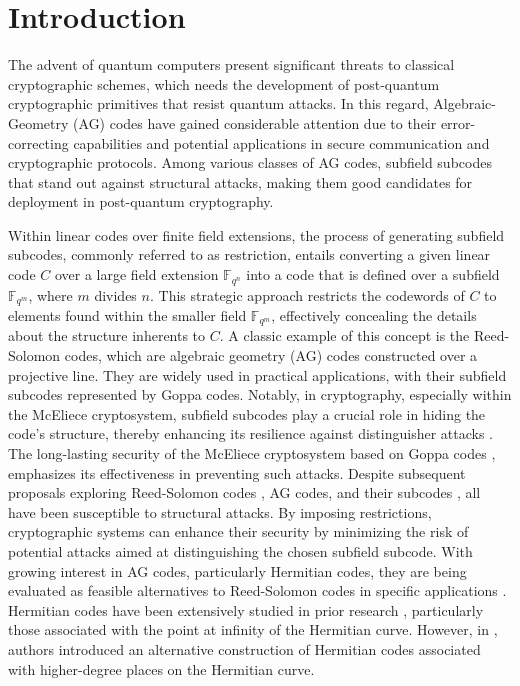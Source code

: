 \documentclass[entropy,article,submit,pdftex,moreauthors]{Definitions/mdpi}
\begin{document}
\section{Introduction}

The advent of quantum computers present significant threats to classical cryptographic schemes, which needs the development of post-quantum cryptographic primitives that resist quantum attacks. In this regard, Algebraic-Geometry (AG) codes have gained considerable attention due to their error-correcting capabilities and potential applications in secure communication and cryptographic protocols. Among various classes of AG codes, subfield subcodes that stand out against structural attacks, making them good candidates for deployment in post-quantum cryptography.



Within linear codes over finite field extensions, the process of generating subfield subcodes, commonly referred to as restriction, entails converting a given linear code $C$ over a large field extension $\mathbb{F}_{q^n}$ into a code that is defined over a subfield $\mathbb{F}_{q^m}$, where $m$ divides $n$. This strategic approach restricts the codewords of $C$ to elements found within the smaller field $\mathbb{F}_{q^m}$, effectively concealing the details about the structure inherents to $C$. A classic example of this concept is the Reed-Solomon codes, which are algebraic geometry (AG) codes constructed over a projective line. They are widely used in practical applications, with their subfield subcodes represented by Goppa codes. Notably, in cryptography, especially within the McEliece cryptosystem, subfield subcodes play a crucial role in hiding the code's structure, thereby enhancing its resilience against distinguisher attacks \cite{sendrier2002security, faugere2013distinguisher}. The long-lasting security of the McEliece cryptosystem based on Goppa codes \cite{mceliece1978public}, emphasizes its effectiveness in preventing such attacks. Despite subsequent proposals exploring Reed-Solomon codes \cite{couvreur2014distinguisher}, AG codes, and their subcodes \cite{couvreur2017cryptanalysis}, all have been susceptible to structural attacks. By imposing restrictions, cryptographic systems can enhance their security by minimizing the risk of potential attacks aimed at distinguishing the chosen subfield subcode. With growing interest in AG codes, particularly Hermitian codes, they are being evaluated as feasible alternatives to Reed-Solomon codes in specific applications \cite{macdonald2003hermitian}. Hermitian codes have been extensively studied in prior research \cite{stichtenoth1988note, little1997structure, yang1992true, korchmaros2019codes, ren2004structure, lhotel2023goppa}, particularly those associated with the point at infinity of the Hermitian curve. However, in \cite{korchmaros2013hermitian, matthews2005one}, authors introduced an alternative construction of Hermitian codes associated with higher-degree places on the Hermitian curve.
\end{document}
